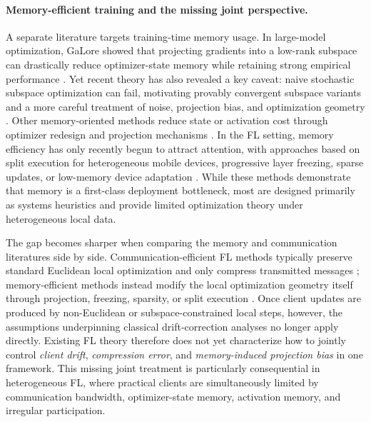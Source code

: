 \paragraph{Memory-efficient training and the missing joint perspective.}
A separate literature targets training-time memory usage. In large-model optimization, GaLore showed that projecting gradients into a low-rank subspace can drastically reduce optimizer-state memory while retaining strong empirical performance \cite{zhao2024galore}. Yet recent theory has also revealed a key caveat: naive stochastic subspace optimization can fail, motivating provably convergent subspace variants and a more careful treatment of noise, projection bias, and optimization geometry \cite{he2024subspace}. Other memory-oriented methods reduce state or activation cost through optimizer redesign and projection mechanisms \cite{horvath2024frugal}. In the FL setting, memory efficiency has only recently begun to attract attention, with approaches based on split execution for heterogeneous mobile devices, progressive layer freezing, sparse updates, or low-memory device adaptation \cite{chen2025splitfl,wu2024progressive,tinyfel2025}. While these methods demonstrate that memory is a first-class deployment bottleneck, most are designed primarily as systems heuristics and provide limited optimization theory under heterogeneous local data.

The gap becomes sharper when comparing the memory and communication literatures side by side. Communication-efficient FL methods typically preserve standard Euclidean local optimization and only compress transmitted messages \cite{alistarh2016qsgd,richtarik2021ef21,huang2023stochastic}; memory-efficient methods instead modify the local optimization geometry itself through projection, freezing, sparsity, or split execution \cite{zhao2024galore,he2024subspace,wu2024progressive,chen2025splitfl}. Once client updates are produced by non-Euclidean or subspace-constrained local steps, however, the assumptions underpinning classical drift-correction analyses no longer apply directly. Existing FL theory therefore does not yet characterize how to jointly control \emph{client drift}, \emph{compression error}, and \emph{memory-induced projection bias} in one framework. This missing joint treatment is particularly consequential in heterogeneous FL, where practical clients are simultaneously limited by communication bandwidth, optimizer-state memory, activation memory, and irregular participation.

